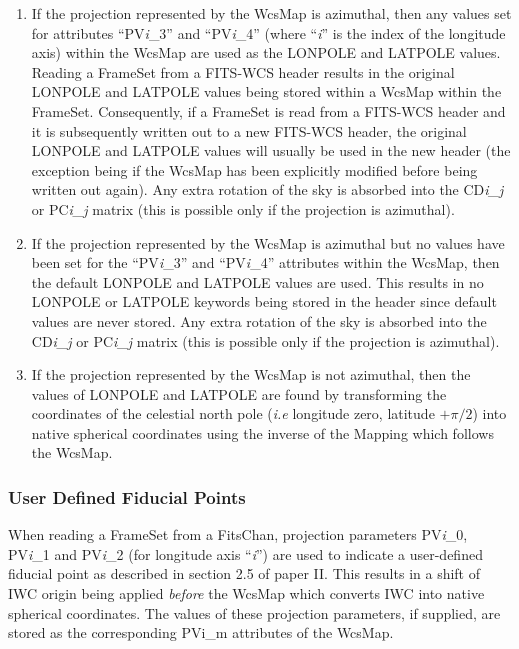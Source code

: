 \documentclass[twoside,11pt]{article}
\begin{document}
\begin{enumerate}

\item If the projection represented by the WcsMap is 
azimuthal, then any values set for attributes ``PV\emph{i}\_3'' 
and ``PV\emph{i}\_4'' (where ``\emph{i}'' is the index of the longitude axis) 
within the WcsMap are used as the LONPOLE and LATPOLE values. Reading a 
FrameSet from a FITS-WCS header
results in the original LONPOLE and LATPOLE values being stored within a
WcsMap within the FrameSet. Consequently, if a FrameSet is read from a
FITS-WCS header and it is subsequently written out to a new FITS-WCS
header, the original LONPOLE and LATPOLE values will usually be used in
the new header (the exception being if the WcsMap has been explicitly
modified before being written out again). Any extra rotation of the sky
is absorbed into the CD\emph{i\_j} or PC\emph{i\_j} matrix (this is
possible only if the projection is azimuthal).

\item If the projection represented by the WcsMap is azimuthal but no
values have been set for the ``PV\emph{i}\_3'' and ``PV\emph{i}\_4''
attributes within the WcsMap, then the default LONPOLE and LATPOLE values
are used. This results in no LONPOLE or LATPOLE keywords being stored in
the header since default values are never stored. Any extra rotation of
the sky is absorbed into the CD\emph{i\_j} or PC\emph{i\_j} matrix (this
is possible only if the projection is azimuthal).

\item If the projection represented by the WcsMap is not azimuthal,
then the values of LONPOLE and LATPOLE are found by transforming the
coordinates of the celestial north pole (\emph{i.e} longitude zero,
latitude $+\pi/2$) into native spherical coordinates using the inverse of
the Mapping which follows the WcsMap.

\end{enumerate}

\subsubsection{User Defined Fiducial Points}
When reading a FrameSet from a FitsChan, projection parameters
PV\emph{i}\_0, PV\emph{i}\_1 and PV\emph{i}\_2 (for longitude axis
``\emph{i}'') are used to indicate a user-defined fiducial point as
described in section 2.5 of paper II. This results in a shift of IWC
origin being applied \emph{before} the WcsMap which converts 
IWC into
native spherical coordinates. The values of these projection parameters,
if supplied, are stored as the corresponding PVi\_m attributes 
of the WcsMap.
\end{document}
